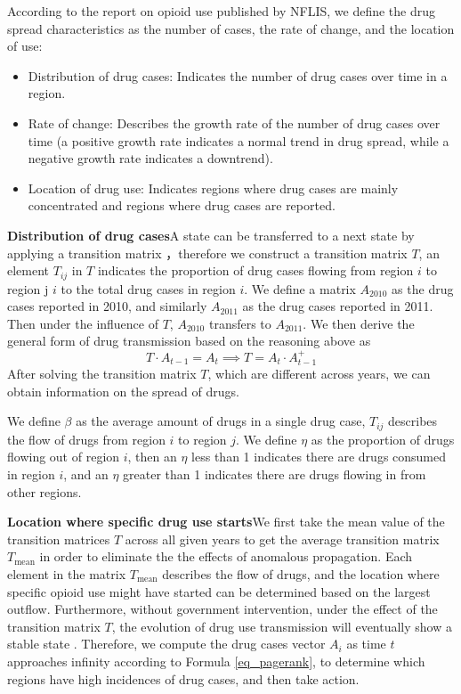 According to the report on opioid use published by NFLIS\cite{characteristic}, we define the drug spread characteristics as the number of cases, the rate of change, and the location of use:

\begin{itemize}
	\item Distribution of drug cases: Indicates the number of drug cases over time in a region.
	\item Rate of change: Describes the growth rate of the number of drug cases over time (a positive growth rate indicates a normal trend in drug spread, while a negative growth rate indicates a downtrend).
	\item Location of drug use: Indicates regions where drug cases are mainly concentrated and regions where drug cases are reported.
\end{itemize}

\textbf{Distribution of drug cases}\quad A state can be transferred to a next state by applying a transition matrix \cite{pagerank}，therefore we construct a transition matrix $T$, an element $T_{ij}$ in $T$ indicates the proportion of drug cases flowing from region $i$ to region j $i$ to the total drug cases in region $i$. We define a matrix $A_{2010}$ as the drug cases reported in 2010, and similarly $A_{2011}$ as the drug cases reported in 2011. Then under the influence of $T$, $A_{2010}$ transfers to $A_{2011}$. We then derive the general form of drug transmission based on the reasoning above as
\begin{equation}
	T \cdot A_{t-1}=A_t \implies T=A_t \cdot A_{t-1}^{+}
	\label{eq_pagerank}
\end{equation}
After solving the transition matrix $T$, which are different across years, we can obtain information on the spread of drugs.

We define $\beta$ as the average amount of drugs in a single drug case, $T_{ij}$ describes the flow of drugs from region $i$ to region $j$. We define $\eta$ as the proportion of drugs flowing out of region $i$, then an $\eta$ less than 1 indicates there are drugs consumed in region $i$, and an $\eta$ greater than 1 indicates there are drugs flowing in from other regions.

\textbf{Location where specific drug use starts}\quad We first take the mean value of the transition matrices $T$ across all given years to get the average transition matrix $T_{\mathrm{mean}}$ in order to eliminate the the effects of anomalous propagation. Each element in the matrix $T_{\mathrm{mean}}$ describes the flow of drugs, and the location where specific opioid use might have started can be determined based on the largest outflow. Furthermore, without government intervention, under the effect of the transition matrix $T$, the evolution of drug use transmission will eventually show a stable state \cite{page_stable}. Therefore, we compute the drug cases vector $A_{i}$ as time $t$ approaches infinity according to Formula \ref{eq_pagerank}, to determine which regions have high incidences of drug cases, and then take action.

